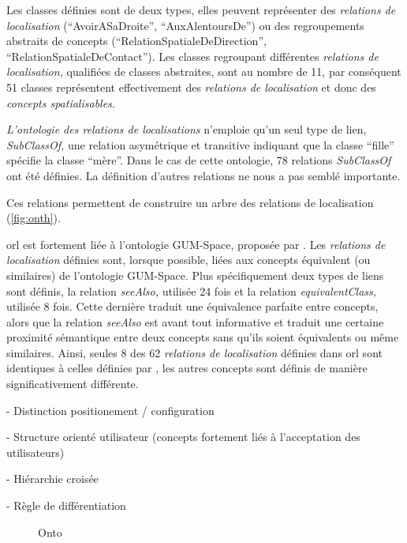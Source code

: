 Les classes définies sont de deux types, elles peuvent représenter des
\emph{relations de localisation} (\eg \enquote{AvoirASaDroite},
\enquote{AuxAlentoursDe}) ou des regroupements abstraits de concepts
(\eg \enquote{RelationSpatialeDeDirection},
\enquote{RelationSpatialeDeContact}). Les classes regroupant
différentes \emph{relations de localisation,} qualifiées de classes
abstraites, sont au nombre de 11, par conséquent 51 classes
représentent effectivement des \emph{relations de localisation} et
donc des \emph{concepts spatialisables.}

\emph{L'ontologie des relations de localisations} n'emploie qu'un seul
type de lien, \emph{SubClassOf,} une relation asymétrique et
transitive indiquant que la classe \enquote{fille} spécifie la classe
\enquote{mère}. Dans le cas de cette ontologie, 78 relations
\emph{SubClassOf} ont été définies. La définition d'autres relations
ne nous a pas semblé importante.

Ces relations permettent de
construire un arbre des relations de localisation
(\autoref{fig:onth}).


\ac{orl} est fortement liée à l'ontologie GUM-Space, proposée par
\textcite{Bateman2010}. Les \emph{relations de localisation} définies
sont, lorsque possible, liées aux concepts équivalent (ou similaires)
de l'ontologie GUM-Space. Plus spécifiquement deux types de liens sont
définis, la relation \emph{seeAlso,} utilisée 24 fois et la relation
\emph{equivalentClass,} utilisée 8 fois. Cette dernière traduit une
équivalence parfaite entre concepts, alors que la relation
\emph{seeAlso} est avant tout informative et traduit une certaine
proximité sémantique entre deux concepts sans qu'ils soient
équivalents ou même similaires. Ainsi, seules 8 des 62 \emph{relations
  de localisation} définies dans \ac{orl} sont identiques à celles
définies par \textcite{Bateman2010}, les autres concepts sont définis
de manière significativement différente.



- Distinction positionement / configuration

- Structure orienté utilisateur (concepts fortement liés à
l'acceptation des utilisateurs)

- Hiérarchie croisée

- Règle de différentiation

\begin{figure}
  \centering
  \caption{Onto}
  \label{fig:ontho}
\end{figure}

